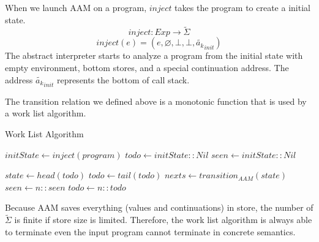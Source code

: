 \documentclass{article}
\begin{document}
When we launch AAM on a program, $inject$ takes the program to create a initial state.
\[
inject : Exp \to \tilde{\Sigma}
\]
\[
inject(e) = (e, \varnothing, \bot, \bot, \tilde{a_k}_{init})
\]
The abstract interpreter starts to analyze a program from the initial state with empty environment, bottom stores, and a special continuation address.
The address $\tilde{a_k}_{init}$ represents the bottom of call stack.

The transition relation we defined above is a monotonic function that is used by a work list algorithm.
\begin{algorithm}
\caption{Work List Algorithm}\label{euclid}
\begin{algorithmic}[1]
\State $\textit{initState} \gets inject(program)$
\State $\textit{todo} \gets \textit{initState} :: Nil$
\State $\textit{seen} \gets \textit{initState} :: Nil$

  \State $\textit{state} \gets head(\textit{todo})$
  \State $\textit{todo} \gets tail(\textit{todo})$
  \State $\textit{nexts} \gets transition_{AAM}(\textit{state})$
      \State $\textit{seen} \gets \textit{n} :: \textit{seen}$
      \State $\textit{todo} \gets \textit{n} :: \textit{todo}$
    \EndIf
  \EndFor
\EndWhile
\end{algorithmic}
\end{algorithm}
Because AAM saves everything (values and continuations) in store, the number of $\tilde{\Sigma}$ is finite if store size is limited.
Therefore, the work list algorithm is always able to terminate even the input program cannot terminate in concrete semantics.
\end{document}
